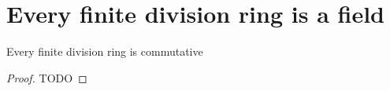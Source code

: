 \chapter{Every finite division ring is a field}

\begin{theorem}
  \label{wedderburn}
  \leanok
  Every finite division ring is commutative
\end{theorem}
\begin{proof}
  TODO
\end{proof}
